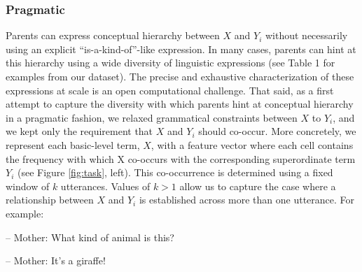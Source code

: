 \documentclass[english,,man]{apa6}
\begin{document}
\hypertarget{pragmatic}{%
\subsubsection{Pragmatic}\label{pragmatic}}

Parents can express conceptual hierarchy between \(X\) and \(Y_i\) without necessarily using an explicit \enquote{is-a-kind-of}-like expression. In many cases, parents can hint at this hierarchy using a wide diversity of linguistic expressions (see Table 1 for examples from our dataset). The precise and exhaustive characterization of these expressions at scale is an open computational challenge. That said, as a first attempt to capture the diversity with which parents hint at conceptual hierarchy in a pragmatic fashion, we relaxed grammatical constraints between \(X\) to \(Y_i\), and we kept only the requirement that \(X\) and \(Y_i\) should co-occur. More concretely, we represent each basic-level term, \(X\), with a feature vector where each cell contains the frequency with which X co-occurs
with the corresponding superordinate term \(Y_i\) (see Figure \ref{fig:task}, left). This co-occurrence is determined using a fixed window of \(k\) utterances. Values of \(k > 1\)
allow us to capture the case where a relationship between \(X\) and \(Y_i\) is established across more than one utterance. For example:

-- Mother: What kind of animal is this?

-- Mother: It's a giraffe!
\end{document}
